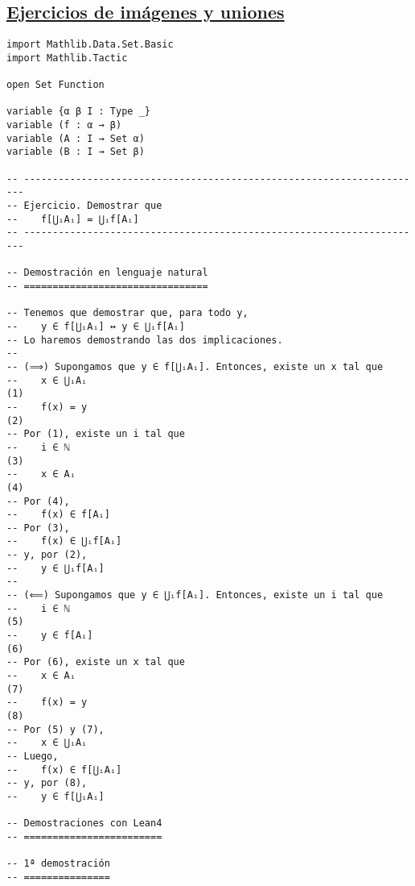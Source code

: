 \subsection{\href{./src/Conjuntos/Ejercicios\_de\_imagenes\_y\_uniones.lean}{Ejercicios de imágenes y uniones}}
\label{sec:org23e356e}
\begin{verbatim}
import Mathlib.Data.Set.Basic
import Mathlib.Tactic

open Set Function

variable {α β I : Type _}
variable (f : α → β)
variable (A : I → Set α)
variable (B : I → Set β)

-- ----------------------------------------------------------------------
-- Ejercicio. Demostrar que
--    f[⋃ᵢAᵢ] = ⋃ᵢf[Aᵢ]
-- ----------------------------------------------------------------------

-- Demostración en lenguaje natural
-- ================================

-- Tenemos que demostrar que, para todo y,
--    y ∈ f[⋃ᵢAᵢ] ↔ y ∈ ⋃ᵢf[Aᵢ]
-- Lo haremos demostrando las dos implicaciones.
--
-- (⟹) Supongamos que y ∈ f[⋃ᵢAᵢ]. Entonces, existe un x tal que
--    x ∈ ⋃ᵢAᵢ                                                       (1)
--    f(x) = y                                                       (2)
-- Por (1), existe un i tal que
--    i ∈ ℕ                                                          (3)
--    x ∈ Aᵢ                                                         (4)
-- Por (4),
--    f(x) ∈ f[Aᵢ]
-- Por (3),
--    f(x) ∈ ⋃ᵢf[Aᵢ]
-- y, por (2),
--    y ∈ ⋃ᵢf[Aᵢ]
--
-- (⟸) Supongamos que y ∈ ⋃ᵢf[Aᵢ]. Entonces, existe un i tal que
--    i ∈ ℕ                                                          (5)
--    y ∈ f[Aᵢ]                                                      (6)
-- Por (6), existe un x tal que
--    x ∈ Aᵢ                                                         (7)
--    f(x) = y                                                       (8)
-- Por (5) y (7),
--    x ∈ ⋃ᵢAᵢ
-- Luego,
--    f(x) ∈ f[⋃ᵢAᵢ]
-- y, por (8),
--    y ∈ f[⋃ᵢAᵢ]

-- Demostraciones con Lean4
-- ========================

-- 1ª demostración
-- ===============


\end{verbatim}
